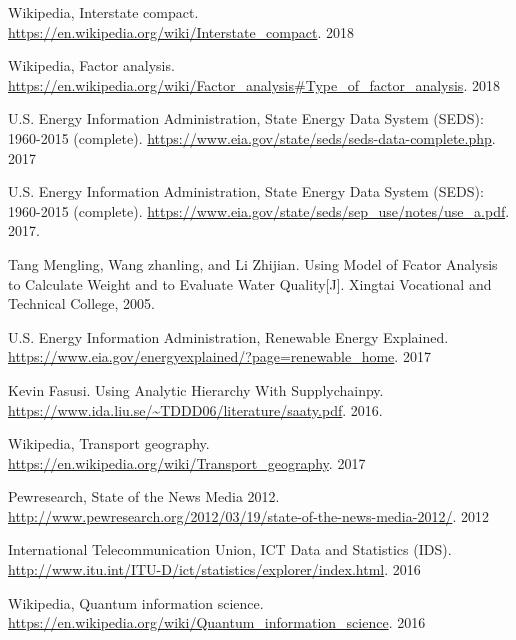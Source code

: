 \documentclass[a4paper,11pt]{article}
\begin{document}
\newpage%
\thispagestyle{empty}%
\begin{thebibliography}{}
%
%
Wikipedia, Interstate compact. \url{https://en.wikipedia.org/wiki/Interstate_compact}. 2018

Wikipedia, Factor analysis. \url{https://en.wikipedia.org/wiki/Factor_analysis#Type_of_factor_analysis}. 2018

U.S. Energy Information Administration, State Energy Data System (SEDS): 1960-2015 (complete). \url{https://www.eia.gov/state/seds/seds-data-complete.php}. 2017

U.S. Energy Information Administration, State Energy Data System (SEDS): 1960-2015 (complete). \url{https://www.eia.gov/state/seds/sep_use/notes/use_a.pdf}. 2017.

Tang Mengling, Wang zhanling, and Li Zhijian. Using Model of Fcator Analysis to Calculate Weight and to Evaluate Water Quality[J]. Xingtai Vocational and Technical College, 2005.

U.S. Energy Information Administration, Renewable Energy Explained. \url{https://www.eia.gov/energyexplained/?page=renewable_home}. 2017


Kevin Fasusi. Using Analytic Hierarchy With Supplychainpy. \url{https://www.ida.liu.se/~TDDD06/literature/saaty.pdf}. 2016.

Wikipedia, Transport geography. \url{https://en.wikipedia.org/wiki/Transport_geography}. 2017


Pewresearch, State of the News Media 2012. \url{http://www.pewresearch.org/2012/03/19/state-of-the-news-media-2012/}. 2012

International Telecommunication Union, ICT Data and Statistics (IDS). \url{http://www.itu.int/ITU-D/ict/statistics/explorer/index.html}. 2016

Wikipedia, Quantum information science. \url{https://en.wikipedia.org/wiki/Quantum_information_science}. 2016
\end{thebibliography}
\end{document}

